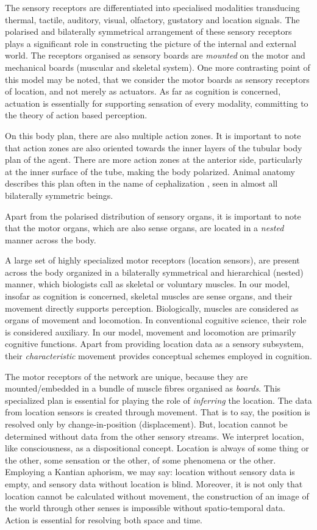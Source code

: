The sensory receptors are differentiated into specialised modalities transducing thermal, tactile, auditory, visual, olfactory, gustatory and location signals. The polarised and bilaterally symmetrical arrangement of these sensory receptors plays a significant role in constructing the picture of the internal and external world. The receptors organised as sensory boards are \textit{mounted} on the motor and mechanical boards (muscular and skeletal system). One more contrasting point of this model may be noted, that we consider the motor boards as sensory receptors of location, and not merely as actuators. As far as cognition is concerned, actuation is essentially for supporting sensation of every modality, committing to the theory of action based perception. 

On this body plan, there are also multiple action zones. It is important to note that action zones are also oriented towards the inner layers of the tubular body plan of the agent. There are more action zones at the anterior side, particularly at the inner surface of the tube, making the body polarized. Animal anatomy describes this plan often in the name of cephalization \cite{hyman1940invertebrates}, seen in almost all bilaterally symmetric beings. 

Apart from the polarised distribution of sensory organs, it is important to note that the motor organs, which are also sense organs, are located in a \textit{nested} manner across the body.

A large set of highly specialized motor receptors (location sensors), are present across the body organized in a bilaterally symmetrical and hierarchical (nested) manner, which biologists call as skeletal or voluntary muscles. In our model, insofar as cognition is concerned, skeletal muscles are sense organs, and their movement directly supports perception. Biologically, muscles are considered as organs of movement and locomotion. In conventional cognitive science, their role is considered auxiliary. In our model, movement and locomotion are primarily cognitive functions. Apart from providing location data as a sensory subsystem, their \textit{characteristic} movement provides conceptual schemes employed in cognition.

The motor receptors of the network are unique, because they are mounted/embedded in a bundle of muscle fibres organised as \textit{boards}. This specialized plan is essential for playing the role of \textit{inferring} the location. The data from location sensors is created through movement. That is to say, the position is resolved only by change-in-position (displacement). But, location cannot be determined without data from the other sensory streams. We interpret location, like consciousness, as a dispositional concept. Location is always of some thing or the other, some sensation or the other, of some phenomena or the other. Employing a Kantian aphorism, we may say: location without sensory data is empty, and sensory data without location is blind. Moreover, it is not only that location cannot be calculated without movement, the construction of an image of the world through other senses is impossible without spatio-temporal data. Action is essential for resolving both space and time.  

